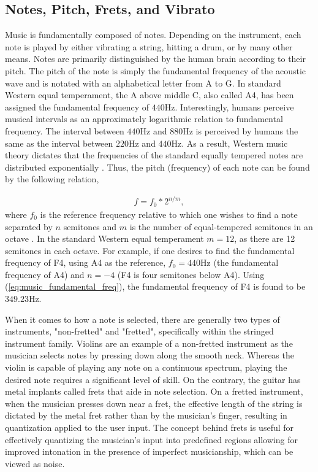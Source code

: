 \documentclass[10pt,journal,final]{IEEEtran}
\begin{document}
\subsection{Notes, Pitch, Frets, and Vibrato}
\label{subsec:notes_pitch_and_virbrato}
Music is fundamentally composed of notes. Depending on the instrument, each note is played by either vibrating a string, hitting a drum, or by many other means. Notes are primarily distinguished by the human brain according to their pitch. The pitch of the note is simply the fundamental frequency of the acoustic wave and is notated with an alphabetical letter from A to G. In standard Western equal temperament, the A above middle C, also called A4, has been assigned the fundamental frequency of $440$Hz. Interestingly, humans perceive musical intervals as an approximately logarithmic relation to fundamental frequency. The interval between $440$Hz and $880$Hz is perceived by humans the same as the interval between $220$Hz and $440$Hz. As a result, Western music theory dictates that the frequencies of the standard equally tempered notes are distributed exponentially \cite{music:Helmholtz}. Thus, the pitch (frequency) of each note can be found by the following relation,

\begin{gather}
\label{eq:music_fundamental_freq}
	f = f_0 * 2^{n/m},
\end{gather}
where $f_0$ is the reference frequency relative to which one wishes to find a note separated by $n$ semitones and $m$ is the number of equal-tempered semitones in an octave \cite{music:basic_music_theory}. In the standard Western equal temperament $m = 12$, as there are 12 semitones in each octave. For example, if one desires to find the fundamental frequency of F4, using A4 as the reference, $f_0 = 440$Hz (the fundamental frequency of A4) and $n = -4$ (F4 is four semitones below A4). Using (\ref{eq:music_fundamental_freq}), the fundamental frequency of F4 is found to be $349.23$Hz.

When it comes to how a note is selected, there are generally two types of instruments, "non-fretted" and "fretted", specifically within the stringed instrument family. Violins are an example of a non-fretted instrument as the musician selects notes by pressing down along the smooth neck. Whereas the violin is capable of playing any note on a continuous spectrum, playing the desired note requires a significant level of skill. On the contrary, the guitar has metal implants called frets that aide in note selection. On a fretted instrument, when the musician presses down near a fret, the effective length of the string is dictated by the metal fret rather than by the musician's finger, resulting in quantization applied to the user input. The concept behind frets is useful for effectively quantizing the musician's input into predefined regions allowing for improved intonation in the presence of imperfect musicianship, which can be viewed as noise.
\end{document}
